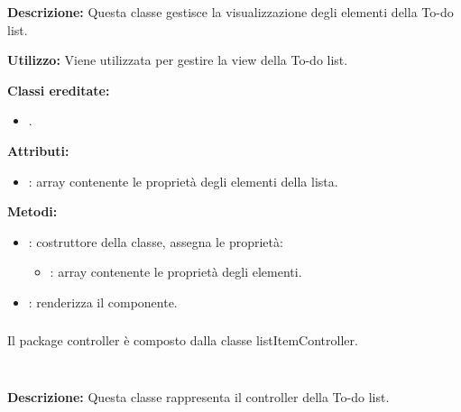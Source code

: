 \subparagraph[::listItem]{\class}\mbox{}\\ \label{\class}
\textbf{Descrizione:}
Questa classe gestisce la visualizzazione degli elementi della To-do list.

\textbf{Utilizzo:}
Viene utilizzata per gestire la view della To-do list.

\textbf{Classi ereditate:}
\begin{itemize}
	\item {}.
\end{itemize}

\textbf{Attributi:}
\begin{itemize}
	\item {}: array contenente le proprietà degli elementi della lista.
\end{itemize}

\textbf{Metodi:}
\begin{itemize}
	\item {}: costruttore della classe, assegna le proprietà:
	\begin{itemize}
		\item {}: array contenente le proprietà degli elementi.
	\end{itemize}
	\item {}: renderizza il componente.
\end{itemize}

\subsubsection[::Controller]{\class} \label{\class}
Il package controller è composto dalla classe listItemController.


\subparagraph[::listItemController]{\class}\mbox{}\\ \label{\class}
\textbf{Descrizione:}
Questa classe rappresenta il controller della To-do list.

